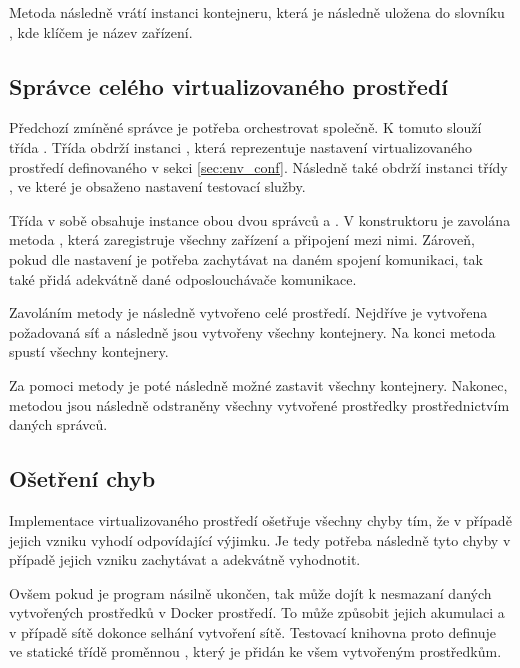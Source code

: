Metoda  následně vrátí instanci kontejneru, která je následně uložena do slovníku , kde klíčem je název zařízení. 

\subsection{Správce celého virtualizovaného prostředí}

Předchozí zmíněné správce je potřeba orchestrovat společně. K tomuto slouží třída . Třída obdrží instanci , která reprezentuje nastavení virtualizovaného prostředí definovaného v sekci \ref{sec:env_conf}. Následně také obdrží instanci třídy , ve které je obsaženo nastavení testovací služby.

Třída v sobě obsahuje instance obou dvou správců  a . V konstruktoru je zavolána metoda , která zaregistruje všechny zařízení a připojení mezi nimi. Zároveň, pokud dle nastavení je potřeba zachytávat na daném spojení komunikaci, tak také přidá adekvátně dané odposlouchávače komunikace. 

Zavoláním metody  je následně vytvořeno celé prostředí. Nejdříve je vytvořena požadovaná síť a následně jsou vytvořeny všechny kontejnery. Na konci metoda spustí všechny kontejnery.

Za pomoci metody  je poté následně možné zastavit všechny kontejnery. Nakonec, metodou  jsou následně odstraněny všechny vytvořené prostředky prostřednictvím daných správců. 

\subsection{Ošetření chyb}

Implementace virtualizovaného prostředí ošetřuje všechny chyby tím, že v případě jejich vzniku vyhodí odpovídající výjimku. Je tedy potřeba následně tyto chyby v případě jejich vzniku zachytávat a adekvátně vyhodnotit.

Ovšem pokud je program násilně ukončen, tak může dojít k nesmazaní daných vytvořených prostředků v Docker prostředí. To může způsobit jejich akumulaci a v případě sítě dokonce selhání vytvoření sítě. Testovací knihovna proto definuje ve statické třídě  proměnnou , který je přidán ke všem vytvořeným prostředkům.

